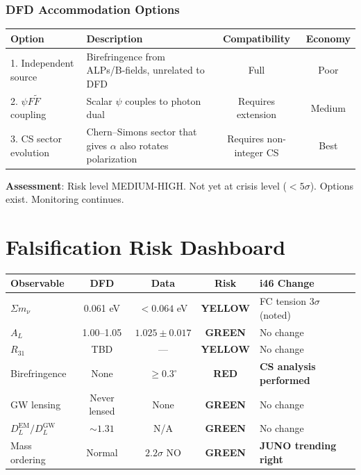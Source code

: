 \documentclass[11pt,a4paper]{article}
\newcommand{\GREEN}{\textcolor{dfdgreen}{\textbf{GREEN}}}
\newcommand{\YELLOW}{\textcolor{dfdyellow}{\textbf{YELLOW}}}
\newcommand{\RED}{\textcolor{dfdred}{\textbf{RED}}}
\begin{document}
\section{DFD Accommodation Options}

\begin{center}
\begin{tabular}{lp{5cm}cc}
\toprule
\textbf{Option} & \textbf{Description} & \textbf{Compatibility} & \textbf{Economy} \\
\midrule
1. Independent source & Birefringence from ALPs/B-fields, unrelated to DFD & Full & Poor \\
2. $\psi F \tilde{F}$ coupling & Scalar $\psi$ couples to photon dual & Requires extension & Medium \\
3. CS sector evolution & Chern--Simons sector that gives $\alpha$ also rotates polarization & Requires non-integer CS & Best \\
\bottomrule
\end{tabular}
\end{center}

\textbf{Assessment}: Risk level MEDIUM-HIGH. Not yet at crisis level ($< 5\sigma$). Options exist. Monitoring continues.


\part{Falsification Risk Dashboard}

\begin{center}
\begin{tabular}{lcccl}
\toprule
\textbf{Observable} & \textbf{DFD} & \textbf{Data} & \textbf{Risk} & \textbf{i46 Change} \\
\midrule
$\Sigma m_\nu$ & 0.061 eV & $< 0.064$ eV & \YELLOW & FC tension $3\sigma$ (noted) \\
$A_L$ & 1.00--1.05 & $1.025 \pm 0.017$ & \GREEN & No change \\
$R_{31}$ & TBD & --- & \YELLOW & No change \\
Birefringence & None & $\geq 0.3^\circ$ & \RED & \textbf{CS analysis performed} \\
GW lensing & Never lensed & None & \GREEN & No change \\
$D_L^{\text{EM}}/D_L^{\text{GW}}$ & $\sim 1.31$ & N/A & \GREEN & No change \\
Mass ordering & Normal & $2.2\sigma$ NO & \GREEN & \textbf{JUNO trending right} \\
\bottomrule
\end{tabular}
\end{center}
\end{document}
